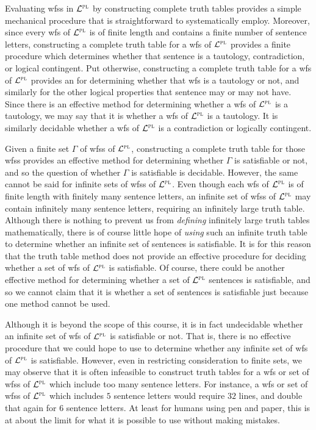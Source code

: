 Evaluating wfss in $\mathcal{L}^{\textsc{pl}}$ by constructing complete truth tables provides a simple mechanical procedure that is straightforward to systematically employ.
Moreover, since every wfs of $\mathcal{L}^{\textsc{pl}}$ is of finite length and contains a finite number of sentence letters, constructing a complete truth table for a wfs of $\mathcal{L}^{\textsc{pl}}$ provides a finite procedure which determines whether that sentence is a tautology, contradiction, or logical contingent.
Put otherwise, constructing a complete truth table for a wfs of $\mathcal{L}^{\textsc{pl}}$ provides an  for determining whether that wfs is a tautology or not, and similarly for the other logical properties that sentence may or may not have.
Since there is an effective method for determining whether a wfs of $\mathcal{L}^{\textsc{pl}}$ is a tautology, we may say that it is  whether a wfs of $\mathcal{L}^{\textsc{pl}}$ is a tautology.
It is similarly decidable whether a wfs of $\mathcal{L}^{\textsc{pl}}$ is a contradiction or logically contingent.

Given a finite set $\Gamma$ of wfss of $\mathcal{L}^{\textsc{pl}}$, constructing a complete truth table for those wfss provides an effective method for determining whether $\Gamma$ is satisfiable or not, and so the question of whether $\Gamma$ is satisfiable is decidable. 
However, the same cannot be said for infinite sets of wfss of $\mathcal{L}^{\textsc{pl}}$.
Even though each wfs of $\mathcal{L}^{\textsc{pl}}$ is of finite length with finitely many sentence letters, an infinite set of wfss of $\mathcal{L}^{\textsc{pl}}$ may contain infinitely many sentence letters, requiring an infinitely large truth table.
Although there is nothing to prevent us from \textit{defining} infinitely large truth tables mathematically, there is of course little hope of \textit{using} such an infinite truth table to determine whether an infinite set of sentences is satisfiable.
It is for this reason that the truth table method does not provide an effective procedure for deciding whether a set of wfs of $\mathcal{L}^{\textsc{pl}}$ is satisfiable. 
Of course, there could be another effective method for determining whether a set of $\mathcal{L}^{\textsc{pl}}$ sentences is satisfiable, and so we cannot claim that it is  whether a set of sentences is satisfiable just because one method cannot be used.

Although it is beyond the scope of this course, it is in fact undecidable whether an infinite set of wfs of $\mathcal{L}^{\textsc{pl}}$ is satisfiable or not.
That is, there is no effective procedure that we could hope to use to determine whether any infinite set of wfs of $\mathcal{L}^{\textsc{pl}}$ is satisfiable. %
However, even in restricting consideration to finite sets, we may observe that it is often infeasible to construct truth tables for a wfs or set of wfss of $\mathcal{L}^{\textsc{pl}}$ which include too many sentence letters.
For instance, a wfs or set of wfss of $\mathcal{L}^{\textsc{pl}}$ which includes $5$ sentence letters would require $32$ lines, and double that again for $6$ sentence letters. 
At least for humans using pen and paper, this is at about the limit for what it is possible to use without making mistakes.

